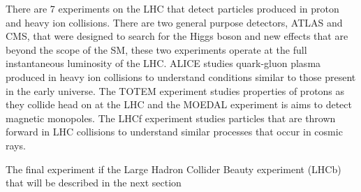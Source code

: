 There are 7 experiments on the LHC that detect particles produced in proton and heavy ion collisions. There are two general purpose detectors, ATLAS and CMS, that were designed to search for the Higgs boson and new effects that are beyond the scope of the SM, these two experiments operate at the full instantaneous luminosity of the LHC. %
ALICE studies quark-gluon plasma produced in heavy ion collisions to understand conditions similar to those present in the early universe. The TOTEM experiment studies properties of protons as they collide head on at the LHC and the MOEDAL experiment is aims to detect magnetic monopoles. The LHCf experiment studies particles that are thrown forward in LHC collisions to understand similar processes that occur in cosmic rays. %


The final experiment if the Large Hadron Collider Beauty experiment (LHCb) that will be described in the next section

